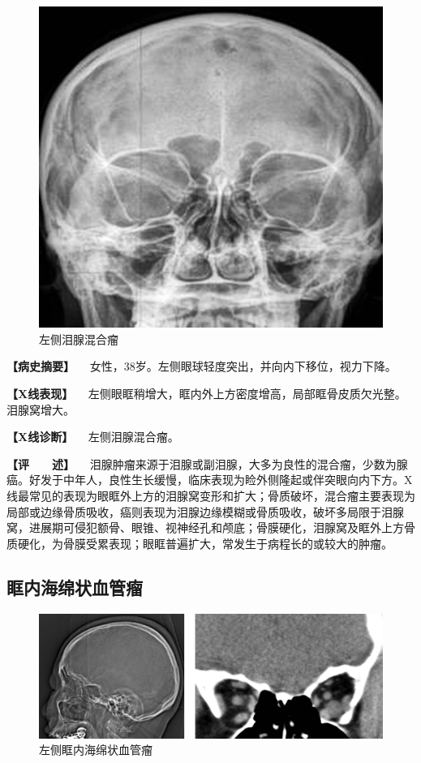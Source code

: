 \begin{figure}[!htbp]
 \centering
 \includegraphics{./images/Image00422.jpg}
 \captionsetup{justification=centering}
 \caption{左侧泪腺混合瘤}
 \label{fig7-2-6}
  \end{figure} 

\textbf{【病史摘要】}
　女性，38岁。左侧眼球轻度突出，并向内下移位，视力下降。

\textbf{【X线表现】}
　左侧眼眶稍增大，眶内外上方密度增高，局部眶骨皮质欠光整。泪腺窝增大。

\textbf{【X线诊断】} 　左侧泪腺混合瘤。

\textbf{【评　　述】}
　泪腺肿瘤来源于泪腺或副泪腺，大多为良性的混合瘤，少数为腺癌。好发于中年人，良性生长缓慢，临床表现为睑外侧隆起或伴突眼向内下方。X线最常见的表现为眼眶外上方的泪腺窝变形和扩大；骨质破坏，混合瘤主要表现为局部或边缘骨质吸收，癌则表现为泪腺边缘模糊或骨质吸收，破坏多局限于泪腺窝，进展期可侵犯额骨、眼锥、视神经孔和颅底；骨膜硬化，泪腺窝及眶外上方骨质硬化，为骨膜受累表现；眼眶普遍扩大，常发生于病程长的或较大的肿瘤。

\subsection{眶内海绵状血管瘤}

\begin{figure}[!htbp]
 \centering
 \includegraphics{./images/Image00423.jpg}
 \captionsetup{justification=centering}
 \caption{左侧眶内海绵状血管瘤}
 \label{fig7-2-7}
  \end{figure} 


